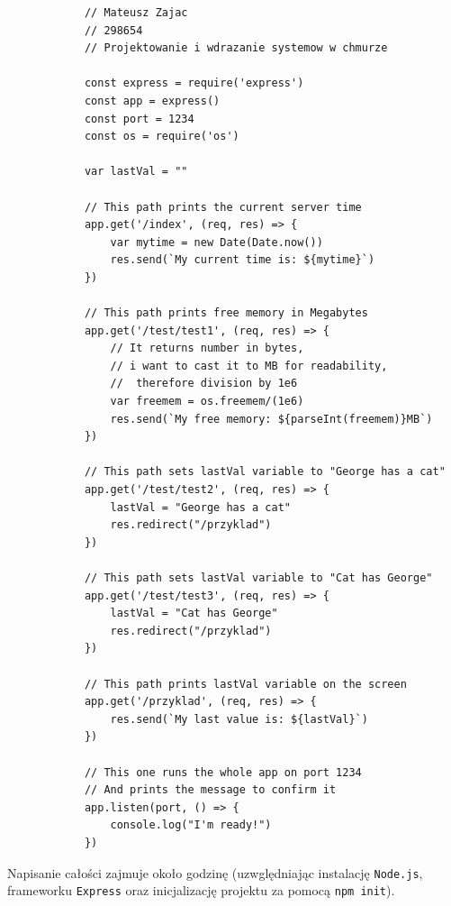 \documentclass{article}
\begin{document}
		\begin{lstlisting}
			// Mateusz Zajac
			// 298654
			// Projektowanie i wdrazanie systemow w chmurze
			
			const express = require('express')
			const app = express()
			const port = 1234
			const os = require('os')
			
			var lastVal = ""
			
			// This path prints the current server time
			app.get('/index', (req, res) => {
				var mytime = new Date(Date.now())
				res.send(`My current time is: ${mytime}`)
			})
			
			// This path prints free memory in Megabytes
			app.get('/test/test1', (req, res) => {
				// It returns number in bytes, 
				// i want to cast it to MB for readability,
				//  therefore division by 1e6
				var freemem = os.freemem/(1e6)
				res.send(`My free memory: ${parseInt(freemem)}MB`)
			})
			
			// This path sets lastVal variable to "George has a cat"
			app.get('/test/test2', (req, res) => {
				lastVal = "George has a cat"
				res.redirect("/przyklad")
			})
			
			// This path sets lastVal variable to "Cat has George"
			app.get('/test/test3', (req, res) => {
				lastVal = "Cat has George"
				res.redirect("/przyklad")
			})
			
			// This path prints lastVal variable on the screen
			app.get('/przyklad', (req, res) => {
				res.send(`My last value is: ${lastVal}`)
			})
			
			// This one runs the whole app on port 1234
			// And prints the message to confirm it
			app.listen(port, () => {
				console.log("I'm ready!")
			})
		\end{lstlisting}
		Napisanie całości zajmuje około godzinę (uzwględniając instalację \texttt{Node.js}, frameworku \texttt{Express} oraz inicjalizację projektu za pomocą \texttt{npm init}).
\end{document}
